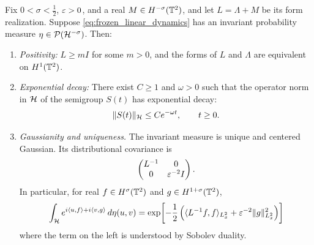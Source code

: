 \begin{proposition}\label{prop_characterization_invmsr}
Fix \(0<\sigma<\frac12\), \(\varepsilon>0\), and a real
\(M\in H^{-\sigma}(\mathbb{T}^2)\), and let \(L=\Lambda+M\) be its form
realization. Suppose \eqref{eq:frozen_linear_dynamics} has an invariant probability measure
\(\eta\in\mathcal P(\mathcal{H}^{-\sigma})\). Then:
\begin{enumerate}
 \item \emph{Positivity:} \(L\geq mI\) for some \(m>0\), and the forms of \(L\) and
       \(\Lambda\) are equivalent on \(H^1(\mathbb{T}^2)\).
 \item \emph{Exponential decay:} There exist \(C\geq1\) and \(\omega>0\) such that the operator norm in $\mathcal{H}$ of the semigroup $S(t)$ has exponential decay:
 \begin{equation}\label{etA_exponential_decay}
    \|S(t)\|_{\mathcal{H}}\leq Ce^{-\omega t},
       \qquad t\geq0.
 \end{equation}
 \item \emph{Gaussianity and uniqueness.} The invariant measure is unique and centered Gaussian.
       Its distributional covariance is
 \begin{equation}\label{eq:characterized_covariance}
       \begin{pmatrix}L^{-1}&0\\0&\varepsilon^{-2}I\end{pmatrix}.
 \end{equation}
 In particular, for real \(f\in H^\sigma(\mathbb{T}^2)\) and
 \(g\in H^{1+\sigma}(\mathbb{T}^2)\),
 \begin{equation}\label{eq:characteristic_functional_mu}
  \int_{\mathcal H} e^{i\langle u,f\rangle+i\langle v,g\rangle}\,d\eta(u,v)
   =\exp\!\left[-\frac12\left(
       \langle L^{-1}f,f\rangle_{L^2_x}
          +\varepsilon^{-2}\|g\|_{L^2_x}^2\right)\right]
 \end{equation}
 where the term on the left is understood by Sobolev duality.
\end{enumerate}
\end{proposition}

